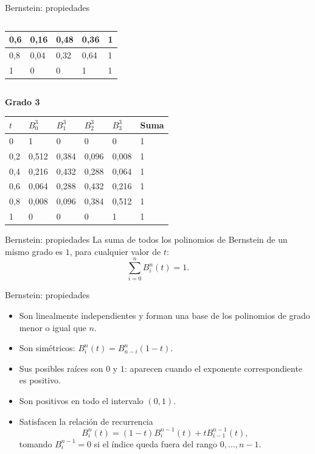 \documentclass[main.tex]{subfiles}
\begin{document}
\begin{frame}[t]{Bernstein: propiedades}
\begin{columns}[T]
\begin{column}{.48\textwidth}
\begin{center}
\begin{tabular}{|C{.155\textwidth}|C{.155\textwidth}|C{.155\textwidth}|C{.155\textwidth}|C{.155\textwidth}|}
\rule[-1.5mm]{0pt}{3.7mm}0,6 & 0,16 & 0,48 & 0,36 & 1\\\hline
\rule[-1.5mm]{0pt}{3.7mm}0,8 & 0,04 & 0,32 & 0,64 & 1\\\hline
\rule[-1.5mm]{0pt}{3.7mm}1 & 0 & 0 & 1 & 1\\\hline
\end{tabular}\end{center}\endgroup\end{column}\end{columns}\textbf{Grado 3}\begingroup\scriptsize\setlength{\tabcolsep}{2pt}\begin{center}\begin{tabular}{|C{.14\textwidth}|C{.14\textwidth}|C{.14\textwidth}|C{.14\textwidth}|C{.14\textwidth}|C{.14\textwidth}|}\hline
$t$ & $B_0^3$ & $B_1^3$ & $B_2^3$ & $B_3^3$ & Suma\\\hline
\rule[-1.5mm]{0pt}{3.7mm}0 & 1 & 0 & 0 & 0 & 1\\\hline
\rule[-1.5mm]{0pt}{3.7mm}0,2 & 0,512 & 0,384 & 0,096 & 0,008 & 1\\\hline
\rule[-1.5mm]{0pt}{3.7mm}0,4 & 0,216 & 0,432 & 0,288 & 0,064 & 1\\\hline
\rule[-1.5mm]{0pt}{3.7mm}0,6 & 0,064 & 0,288 & 0,432 & 0,216 & 1\\\hline
\rule[-1.5mm]{0pt}{3.7mm}0,8 & 0,008 & 0,096 & 0,384 & 0,512 & 1\\\hline
\rule[-1.5mm]{0pt}{3.7mm}1 & 0 & 0 & 0 & 1 & 1\\\hline
\end{tabular}\end{center}\endgroup
\end{frame}

\begin{frame}[t]{Bernstein: propiedades}
La suma de todos los polinomios de Bernstein de un mismo grado es $1$, para cualquier valor de $t$:\[\sum_{i=0}^{n}B_i^n(t)=1.\]
\end{frame}

\begin{frame}[t]{Bernstein: propiedades}
\small\begin{itemize}
\item Son linealmente independientes y forman una base de los polinomios de grado menor o igual que $n$.
\item Son simétricos: $B_i^n(t)=B_{n-i}^n(1-t)$.
\item Sus posibles raíces son $0$ y $1$: aparecen cuando el exponente correspondiente es positivo.
\item Son positivos en todo el intervalo $(0,1)$.
\item Satisfacen la relación de recurrencia\[B_i^n(t)=(1-t)B_i^{n-1}(t)+tB_{i-1}^{n-1}(t),\]tomando $B_i^{n-1}=0$ si el índice queda fuera del rango $0,\ldots,n-1$.
\end{itemize}
\end{frame}
\end{document}
